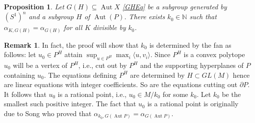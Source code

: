 \documentclass{article}
\newcommand{\NN}{{\mathbb N}}
\renewcommand{\>}{\rightarrow}
\DeclareMathOperator{\Aut}{Aut}
\theoremstyle{plain}
\newtheorem{proposition}[theorem]{Proposition}
\theoremstyle{definition}
\newtheorem{remark}[theorem]{Remark}
\newcommand{\bremark}{\begin{remark}}
\newcommand{\eremark}{\end{remark}}
\newcommand{\bprop}{\begin{proposition}}
\newcommand{\eprop}{\end{proposition}}
\def\lb#1{\label{#1}}
\begin{document}
\bprop
\lb{divisibleProp}
Let $G(H)\subseteq\Aut X$ \eqref{GHEq} be a subgroup generated by $(S^1)^n$ and a subgroup $H$ of $\Aut(P)$.
There exists $k_0\in\NN$ such that 
$\alpha_{K,G(H)}=\alpha_{G(H)}$ for all $K$ divisible by $k_0$. 
\eprop

\bremark
\lb{Minu0Rem}
In fact, the proof will show that $k_0$ is determined by the fan as follows: 
let $u_0\in P^H$ attain
$\sup_{u\in P^H}\max_i\langle u,v_i\rangle$.
Since $P^H$ is a convex polytope $u_0$ will be a vertex of $P^H$, i.e., cut out by $P^H$ and the supporting hyperplanes of $P$ containing $u_0$. The equations defining $P^H$ are determined by $H\subset GL(M)$ hence are linear equations with integer coefficients. So are the equations cutting out $\partial P$. It follows that $u_0$ is a rational point, i.e., $u_0\in M/k_0$ for some $k_0$. Let $k_0$ be the smallest such positive integer.
The fact that $u_0$ is a rational point is originally due
to Song \cite[p. 1257]{Song} who proved that 
$\alpha_{k_0,G(\Aut P)}=\alpha_{G(\Aut P)}$.

\eremark
\end{document}
